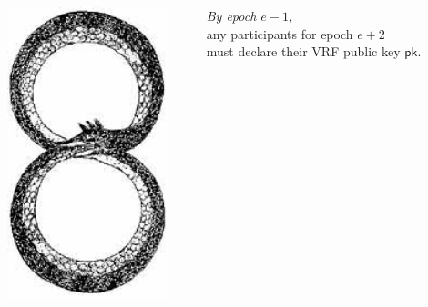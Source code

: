 \documentclass[fleqn,xcolor={usenames,dvipsnames},notes,aspectratio=169]{beamer} %
\newcommand{\pk}{\ensuremath{\mathsf{pk}}}
\begin{document}
\begin{frame} %

  \begin{columns}
   \begin{column}{0.35\textwidth}
   \includegraphics[width=0.9\textwidth]{../pics/ouroborous/ouroboros_double.jpg}
   \end{column}
   \begin{column}{0.65\textwidth}
    {\em By epoch $e-1$,} \\ \hspace*{3pt} 
     any participants for epoch $e+2$ \\ \hspace*{3pt} 
     must declare their VRF public key $\pk$.


\end{column}
\end{columns}
\end{frame}
\end{document}
